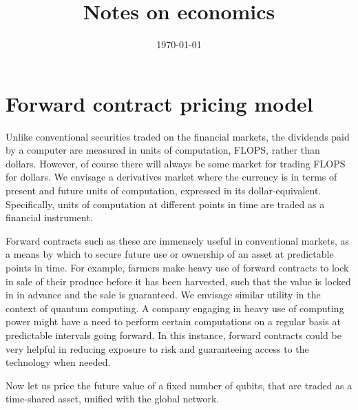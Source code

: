 \documentclass[aps,pra,twocolumn,amsmath,amssymb,nofootinbib,superscriptaddress]{revtex4}
\begin{document}


%
%

\title{Notes on economics}

%
%

\date{\today}

\frenchspacing

%
%

\begin{abstract}
\end{abstract}

\maketitle 

%
%

\section{Forward contract pricing model}

Unlike conventional securities traded on the financial markets, the dividends paid by a computer are measured in units of computation, FLOPS, rather than dollars. However, of course there will always be some market for trading FLOPS for dollars. We envisage a derivatives market where the currency is in terms of present and future units of computation, expressed in its dollar-equivalent. Specifically, units of computation at different points in time are traded as a financial instrument.

Forward contracts such as these are immensely useful in conventional markets, as a means by which to secure future use or ownership of an asset at predictable points in time. For example, farmers make heavy use of forward contracts to lock in sale of their produce before it has been harvested, such that the value is locked in in advance and the sale is guaranteed. We envisage similar utility in the context of quantum computing. A company engaging in heavy use of computing power might have a need to perform certain computations on a regular basis at predictable intervals going forward. In this instance, forward contracts could be very helpful in reducing exposure to risk and guaranteeing access to the technology when needed.

Now let us price the future value of a fixed number of qubits, that are traded as a time-shared asset, unified with the global network. 
\end{document}
